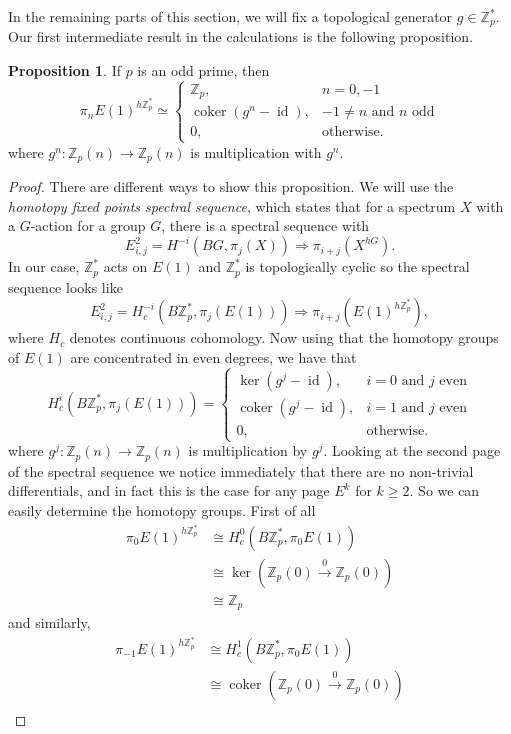 \documentclass[a4paper]{article} %
\theoremstyle{definition}
\newtheorem{proposition}[theorem]{Proposition}
\newcommand{\toWithMapLong}[1]{\overset{#1}{\longrightarrow}}
\newcommand{\Z}{\mathbb{Z}}
\DeclareMathOperator{\id}{id}           %
\DeclareMathOperator{\coker}{coker}     %
\renewcommand{\implies}{\Rightarrow}    %
\begin{document}
In the remaining parts of this section, we will fix a topological generator $g \in \Z_p^*$. Our first intermediate result in the calculations is the following proposition.
\begin{proposition}
  If $p$ is an odd prime, then
  \[
   \pi_n E(1)^{h\Z_p^*} \simeq
     \begin{cases}
     \Z_p, & n=0,-1 \\
     \coker (g^n - \id), & -1 \neq n \text{ and $n$ odd} \\
     0, & \text{otherwise.}
     \end{cases}
   \]
   where $g^n \colon \Z_p(n) \to \Z_p(n)$ is multiplication with $g^n$.
\end{proposition}
\begin{proof}
There are different ways to show this proposition. We will use the \textit{homotopy fixed points spectral sequence}, which states that for a spectrum $X$ with a $G$-action for a group $G$, there is a spectral sequence with
\[
E^2_{i,j} = H^{-i}(BG, \pi_j(X)) \implies \pi_{i+j}(X^{hG}).
\]
In our case, $\Z_p^*$ acts on $E(1)$ and $\Z_p^*$ is topologically cyclic so the spectral sequence looks like
\[
E^2_{i,j} = H_c^{-i}(B\Z_p^*, \pi_j(E(1))) \implies \pi_{i+j}(E(1)^{h\Z_p^*}),
\]
where $H_c$ denotes continuous cohomology. Now using that the homotopy groups of $E(1)$ are concentrated in even degrees, we have that
\[
  H^i_c(B\Z_p^*, \pi_j(E(1))) =
\begin{cases}
\ker (g^j - \id), & i=0 \text{ and } j \text{ even} \\
\coker (g^j - \id), & i=1 \text{ and } j \text{ even} \\
0, & \text{otherwise.}
\end{cases}
\]
where $g^j \colon \Z_p(n) \to \Z_p(n)$ is multiplication by $g^j$. Looking at the second page of the spectral sequence we notice immediately that there are no non-trivial differentials, and in fact this is the case for any page $E^k$ for $k \ge 2$. So we can easily determine the homotopy groups. First of all
\begin{align*}
  \pi_0 E(1)^{h\Z_p^*} & \cong  H^0_c(B\Z_p^*, \pi_0 E(1)) \\
    & \cong \ker (\Z_p(0) \toWithMapLong{0} \Z_p(0)) \\
    & \cong \Z_p
\end{align*}
and similarly,
\begin{align*}
  \pi_{-1} E(1)^{h\Z_p^*} & \cong  H^1_c(B\Z_p^*, \pi_0 E(1)) \\
    & \cong \coker (\Z_p(0) \toWithMapLong{0} \Z_p(0)) \\

\end{align*}
\end{proof}
\end{document}
